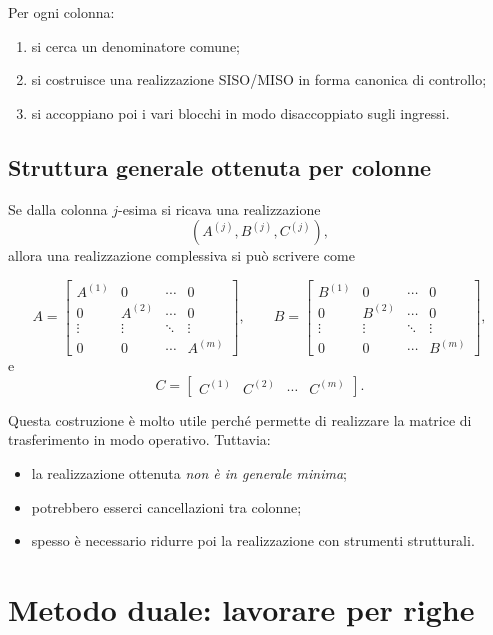 Per ogni colonna:
\begin{enumerate}
    \item si cerca un denominatore comune;
    \item si costruisce una realizzazione SISO/MISO in forma canonica di controllo;
    \item si accoppiano poi i vari blocchi in modo disaccoppiato sugli ingressi.
\end{enumerate}

\subsection{Struttura generale ottenuta per colonne}

Se dalla colonna \(j\)-esima si ricava una realizzazione
\[
(A^{(j)},B^{(j)},C^{(j)}),
\]
allora una realizzazione complessiva si può scrivere come

\[
A=
\begin{bmatrix}
A^{(1)} & 0 & \cdots & 0\\
0 & A^{(2)} & \cdots & 0\\
\vdots & \vdots & \ddots & \vdots\\
0 & 0 & \cdots & A^{(m)}
\end{bmatrix},
\qquad
B=
\begin{bmatrix}
B^{(1)} & 0 & \cdots & 0\\
0 & B^{(2)} & \cdots & 0\\
\vdots & \vdots & \ddots & \vdots\\
0 & 0 & \cdots & B^{(m)}
\end{bmatrix},
\]
e
\[
C=
\begin{bmatrix}
C^{(1)} & C^{(2)} & \cdots & C^{(m)}
\end{bmatrix}.
\]

Questa costruzione è molto utile perché permette di realizzare la matrice di trasferimento in modo operativo. Tuttavia:
\begin{itemize}
    \item la realizzazione ottenuta \emph{non è in generale minima};
    \item potrebbero esserci cancellazioni tra colonne;
    \item spesso è necessario ridurre poi la realizzazione con strumenti strutturali.
\end{itemize}

\bigskip

\section{Metodo duale: lavorare per righe}

